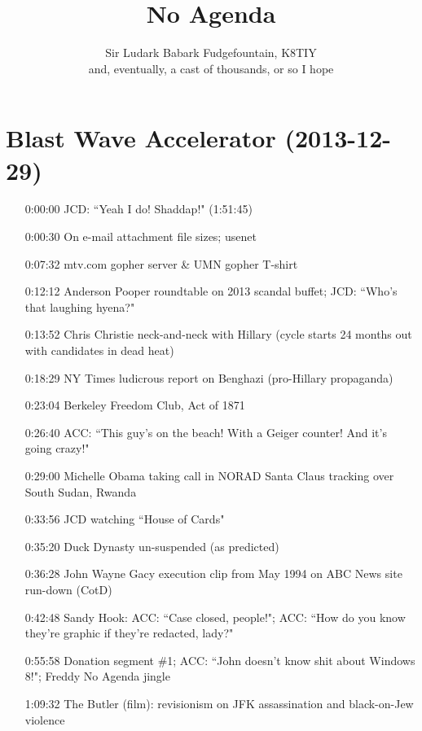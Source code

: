 \documentclass{report}
\newcommand{\mono}[1]{{\fontspec{Courier}#1}}
\begin{document}
\title{{\Huge \mono{No Agenda}}}
\author{Sir Ludark Babark Fudgefountain, \mono{K8TIY}\\\small{and, eventually, a cast of thousands, or so I hope}}
\maketitle
\setcounter{section}{578}\section[Blast Wave Accelerator]{Blast Wave Accelerator \small{(2013-12-29)}}
\begin{itemize}
\item[\mono{0:00:00}] JCD: ``Yeah I do! Shaddap!" (1:51:45)
\item[\mono{0:00:30}] On e-mail attachment file sizes; usenet
\item[\mono{0:07:32}] mtv.com gopher server \& UMN gopher T-shirt
\item[\mono{0:12:12}] Anderson Pooper roundtable on 2013 scandal buffet; JCD: ``Who's that laughing hyena?"
\item[\mono{0:13:52}] Chris Christie neck-and-neck with Hillary (cycle starts 24 months out with candidates in dead heat)
\item[\mono{0:18:29}] NY Times ludicrous report on Benghazi (pro-Hillary propaganda)
\item[\mono{0:23:04}] Berkeley Freedom Club, Act of 1871
\item[\mono{0:26:40}] ACC: ``This guy's on the beach! With a Geiger counter! And it's going crazy!"
\item[\mono{0:29:00}] Michelle Obama taking call in NORAD Santa Claus tracking over South Sudan, Rwanda
\item[\mono{0:33:56}] JCD watching ``House of Cards"
\item[\mono{0:35:20}] Duck Dynasty un-suspended (as predicted)
\item[\mono{0:36:28}] John Wayne Gacy execution clip from May 1994 on ABC News site run-down (CotD)
\item[\mono{0:42:48}] Sandy Hook: ACC: ``Case closed, people!"; ACC: ``How do you know they're graphic if they're redacted, lady?"
\item[\mono{0:55:58}] Donation segment \#1; ACC: ``John doesn't know shit about Windows 8!"; Freddy No Agenda jingle
\item[\mono{1:09:32}] The Butler (film): revisionism on JFK assassination and black-on-Jew violence

\end{itemize}
\end{document}
